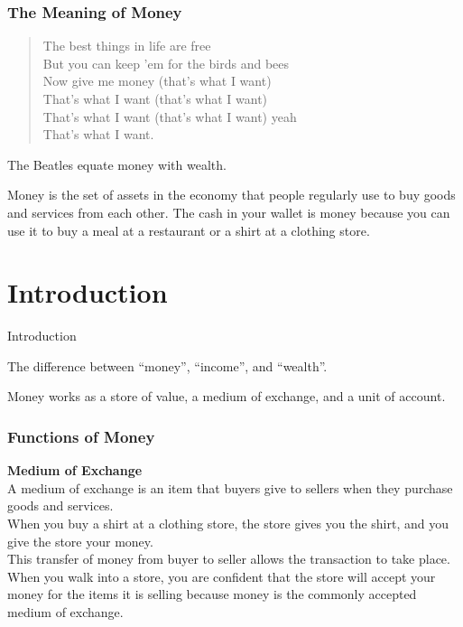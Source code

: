 \documentclass[shownotes,11pt, aspectratio=169]{beamer}
\newenvironment{wideitemize}{\itemize\addtolength{\itemsep}{10pt}}{\enditemize}
\begin{document}
\begin{frame}
\frametitle{The Meaning of Money}
\begin{quote}
The best things in life are free \\
But you can keep 'em for the birds and bees \\
Now give me money (that's what I want) \\
That's what I want (that's what I want) \\
That's what I want (that's what I want) yeah \\
That's what I want. \\
\end{quote}
The Beatles equate money with wealth. \\
\pause
\vspace*{3mm}

Money is the set of assets in the economy that people regularly use to buy goods and services from
each other. The cash in your wallet is money because you can use it to buy a meal
at a restaurant or a shirt at a clothing store. 
\end{frame}

\section{Introduction}
\begin{frame}{Introduction}
\begin{wideitemize}
\item The difference between ``money'', ``income'', and ``wealth''.
\pause
\item Money works as a \textcolor{red!80}{store of value}, a \textcolor{red!80}{medium of exchange}, and a \textcolor{red!80}{unit of account}.
\end{wideitemize}
\end{frame}

\begin{frame}
\frametitle{Functions of Money}
\textbf{Medium of Exchange} \\
\vspace{3mm}
A medium of exchange is an item that buyers give to sellers when they purchase
goods and services. \\
\vspace{3mm} When you buy a shirt at a clothing store, the store gives
you the shirt, and you give the store your money.  \\
\vspace{3mm}
This transfer of money from buyer to seller allows the transaction to take place. \\
\vspace{3mm}
 When you walk into a store, you are confident that the store will accept your money for the items it is selling
because money is the commonly accepted medium of exchange.
\end{frame}
\end{document}
